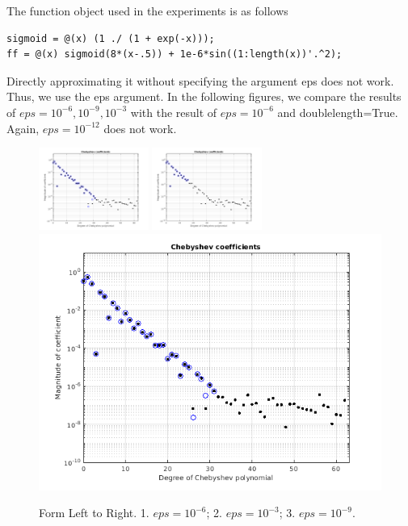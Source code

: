 \documentclass[11pt]{report}
\begin{document}
\noindent The function object used in the experiments is as follows
\begin{verbatim}
sigmoid = @(x) (1 ./ (1 + exp(-x)));
ff = @(x) sigmoid(8*(x-.5)) + 1e-6*sin((1:length(x))'.^2);
\end{verbatim}
Directly approximating it without specifying the argument eps does not work. Thus, we use the eps argument. In the following figures, we compare the results of $eps = 10^{-6}, 10^{-9}, 10^{-3}$ with the result of $eps = 10^{-6}$ and doublelength=True. Again, $eps = 10^{-12}$ does not work.
\begin{figure}[h!]
    \centering
    \includegraphics[width=0.32\textwidth]{CS598SMPPL/hw1/2.1.png}
    \includegraphics[width=0.32\textwidth]{CS598SMPPL/hw1/2.2.png}
    \includegraphics[width=0.32\linewidth]{CS598SMPPL/hw1/2.3.png}
    \caption{Form Left to Right. 1. $eps = 10^{-6}$; 2. $eps = 10^{-3}$; 3. $eps = 10^{-9}$.}
\end{figure}
\end{document}
